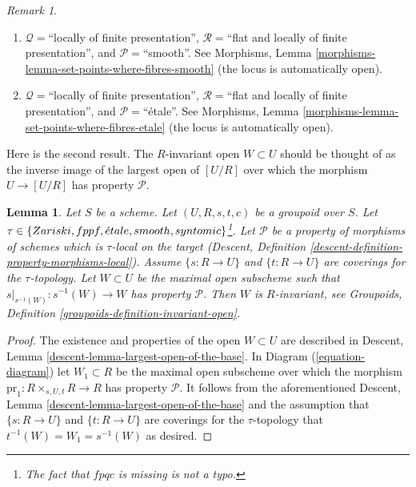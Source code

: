 \documentclass{stacks-project}
\theoremstyle{plain}
\newtheorem{lemma}[subsection]{Lemma}
\theoremstyle{definition}
\theoremstyle{remark}
\newtheorem{remark}[subsection]{Remark}
\numberwithin{equation}{subsection}
\def\etale{{\acute{e}tale}}
\begin{document}
\begin{remark}
\begin{enumerate}
$\mathcal{P}=$``syntomic'' use
Morphisms, Lemma \ref{morphisms-lemma-set-points-where-fibres-lci}
(the locus is automatically open).
\item[(7)] $\mathcal{Q} =$``locally of finite presentation'',
$\mathcal{R} =$``flat and locally of finite presentation'', and
$\mathcal{P}=$``smooth''. See
Morphisms, Lemma \ref{morphisms-lemma-set-points-where-fibres-smooth}
(the locus is automatically open).
\item[(8)] $\mathcal{Q} =$``locally of finite presentation'',
$\mathcal{R} =$``flat and locally of finite presentation'', and
$\mathcal{P}=$``\'etale''. See
Morphisms, Lemma \ref{morphisms-lemma-set-points-where-fibres-etale}
(the locus is automatically open).
\end{enumerate}
\end{remark}

\noindent
Here is the second result. The $R$-invariant open $W \subset U$ should be
thought of as the inverse image of the largest open of $[U/R]$ over which
the morphism $U \to [U/R]$ has property $\mathcal{P}$.

\begin{lemma}
\label{lemma-property-invariant}
Let $S$ be a scheme.
Let $(U, R, s, t, c)$ be a groupoid over $S$.
Let $\tau \in \{Zariski, \linebreak[0] fppf,
\linebreak[0] \etale, \linebreak[0]
smooth, \linebreak[0] syntomic\}$\footnote{The fact that $fpqc$ is missing
is not a typo.}. Let $\mathcal{P}$ be a property of morphisms of schemes
which is $\tau$-local on the target
(Descent, Definition \ref{descent-definition-property-morphisms-local}).
Assume $\{s : R \to U\}$ and $\{t : R \to U\}$ are coverings for the
$\tau$-topology. Let $W \subset U$ be the maximal open subscheme such that
$s|_{s^{-1}(W)} : s^{-1}(W) \to W$ has property $\mathcal{P}$.
Then $W$ is $R$-invariant, see
Groupoids, Definition \ref{groupoids-definition-invariant-open}.
\end{lemma}

\begin{proof}
The existence and properties of the open $W \subset U$ are described in
Descent, Lemma \ref{descent-lemma-largest-open-of-the-base}.
In
Diagram (\ref{equation-diagram})
let $W_1 \subset R$ be the maximal open subscheme over which the morphism
$\text{pr}_1 : R \times_{s, U, t} R \to R$ has property $\mathcal{P}$.
It follows from the aforementioned
Descent, Lemma \ref{descent-lemma-largest-open-of-the-base}
and the assumption that $\{s : R \to U\}$ and $\{t : R \to U\}$ are coverings
for the $\tau$-topology that $t^{-1}(W) = W_1 = s^{-1}(W)$ as desired.
\end{proof}
\end{document}
